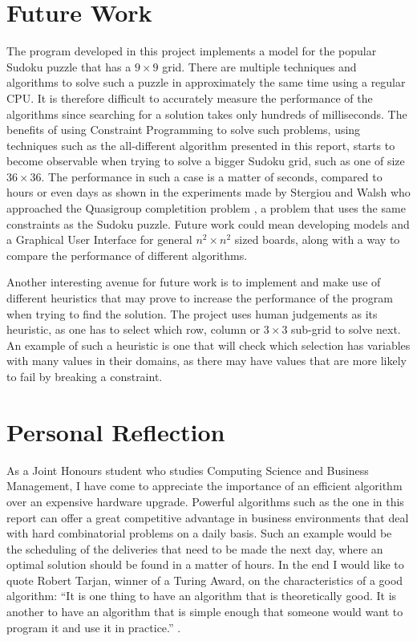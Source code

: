 \documentclass{l4proj}
\begin{document}
\section{Future Work}
\noindent The program developed in this project implements a model for the popular Sudoku puzzle that has a $9 \times 9$ grid. There are multiple techniques and algorithms to solve such a puzzle in approximately the same time using a regular CPU. It is therefore difficult to accurately measure the performance of the algorithms since searching for a solution takes only hundreds of milliseconds. The benefits of using Constraint Programming to solve such problems, using techniques such as the all-different algorithm presented in this report, starts to become observable when trying to solve a bigger Sudoku grid, such as one of size $36 \times 36$. The performance in such a case is a matter of seconds, compared to hours or even days as shown in the experiments made by Stergiou and Walsh \cite{stergiou1999difference} who approached the Quasigroup completition problem \cite{gomes2002completing}, a problem that uses the same constraints as the Sudoku puzzle. Future work could mean developing models and a Graphical User Interface for general $n^2\times n^2$ sized boards, along with a way to compare the performance of different algorithms.

\noindent Another interesting avenue for future work is to implement and make use of different heuristics that may prove to increase the performance of the program when trying to find the solution. The project uses human judgements as its heuristic, as one has to select which row, column or $3 \times 3$ sub-grid to solve next. An example of such a heuristic is one that will check which selection has variables with many values in their domains, as there may have values that are more likely to fail by breaking a constraint.

\section{Personal Reflection}
As a Joint Honours student who studies Computing Science and Business Management, I have come to appreciate the importance of an efficient algorithm over an expensive hardware upgrade. Powerful algorithms such as the one in this report can offer a great competitive advantage in business environments that deal with hard combinatorial problems on a daily basis. Such an example would be the scheduling of the deliveries that need to be made the next day, where an optimal solution should be found in a matter of hours. In the end I would like to quote Robert Tarjan, winner of a Turing Award, on the characteristics of a good algorithm: ``It is one thing to have an algorithm that is theoretically good. It is another to have an algorithm that is simple enough that someone would want to program it and use it in practice.'' \cite{tarjanart}.
\end{document}

